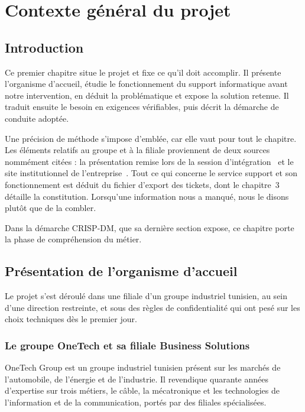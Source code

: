 \chapter{Contexte général du projet}

\section*{Introduction}

Ce premier chapitre situe le projet et fixe ce qu'il doit accomplir. Il présente l'organisme d'accueil, étudie
le fonctionnement du support informatique avant notre intervention, en déduit la problématique et
expose la solution retenue. Il traduit ensuite le besoin en exigences vérifiables, puis décrit la
démarche de conduite adoptée.

Une précision de méthode s'impose d'emblée, car elle vaut pour tout le chapitre. Les éléments
relatifs au groupe et à la filiale proviennent de deux sources nommément citées : la présentation
remise lors de la session d'intégration~\cite{otbs-integration} et le site institutionnel de
l'entreprise~\cite{otbs-site}. Tout ce qui concerne le service support et son fonctionnement est
déduit du fichier d'export des tickets, dont le chapitre~3 détaille la constitution. Lorsqu'une
information nous a manqué, nous le disons plutôt que de la combler.

Dans la démarche CRISP-DM, que sa dernière section expose, ce chapitre porte la phase de
compréhension du métier.

\section{Présentation de l'organisme d'accueil}

Le projet s'est déroulé dans une filiale d'un groupe industriel tunisien, au sein d'une
direction restreinte, et sous des règles de confidentialité qui ont pesé sur les choix
techniques dès le premier jour.

\subsection{Le groupe OneTech et sa filiale Business Solutions}

OneTech Group est un groupe industriel tunisien présent sur les marchés de l'automobile, de
l'énergie et de l'industrie. Il revendique quarante années d'expertise sur trois métiers, le câble,
la mécatronique et les technologies de l'information et de la communication, portés par des filiales
spécialisées.

